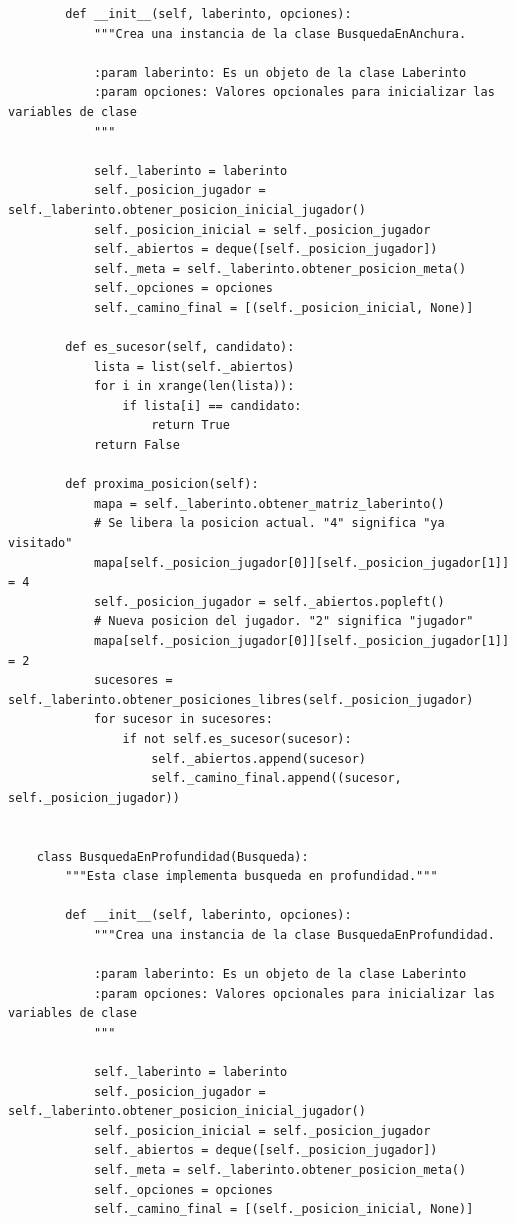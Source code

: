 \documentclass[letter, titlepage, 10pt]{article}
\begin{document}
\begin{lstlisting}
        def __init__(self, laberinto, opciones):
            """Crea una instancia de la clase BusquedaEnAnchura.
            
            :param laberinto: Es un objeto de la clase Laberinto
            :param opciones: Valores opcionales para inicializar las variables de clase
            """
    
            self._laberinto = laberinto
            self._posicion_jugador = self._laberinto.obtener_posicion_inicial_jugador()
            self._posicion_inicial = self._posicion_jugador
            self._abiertos = deque([self._posicion_jugador])
            self._meta = self._laberinto.obtener_posicion_meta()
            self._opciones = opciones
            self._camino_final = [(self._posicion_inicial, None)]
    
        def es_sucesor(self, candidato):
            lista = list(self._abiertos)
            for i in xrange(len(lista)):
                if lista[i] == candidato:
                    return True
            return False
    
        def proxima_posicion(self):
            mapa = self._laberinto.obtener_matriz_laberinto()
            # Se libera la posicion actual. "4" significa "ya visitado"
            mapa[self._posicion_jugador[0]][self._posicion_jugador[1]] = 4
            self._posicion_jugador = self._abiertos.popleft()
            # Nueva posicion del jugador. "2" significa "jugador"
            mapa[self._posicion_jugador[0]][self._posicion_jugador[1]] = 2
            sucesores = self._laberinto.obtener_posiciones_libres(self._posicion_jugador)
            for sucesor in sucesores:
                if not self.es_sucesor(sucesor):
                    self._abiertos.append(sucesor)
                    self._camino_final.append((sucesor, self._posicion_jugador))
    
    
    class BusquedaEnProfundidad(Busqueda):
        """Esta clase implementa busqueda en profundidad."""
    
        def __init__(self, laberinto, opciones):
            """Crea una instancia de la clase BusquedaEnProfundidad.
            
            :param laberinto: Es un objeto de la clase Laberinto
            :param opciones: Valores opcionales para inicializar las variables de clase
            """
    
            self._laberinto = laberinto
            self._posicion_jugador = self._laberinto.obtener_posicion_inicial_jugador()
            self._posicion_inicial = self._posicion_jugador
            self._abiertos = deque([self._posicion_jugador])
            self._meta = self._laberinto.obtener_posicion_meta()
            self._opciones = opciones
            self._camino_final = [(self._posicion_inicial, None)]
    

\end{lstlisting}
\end{document}
